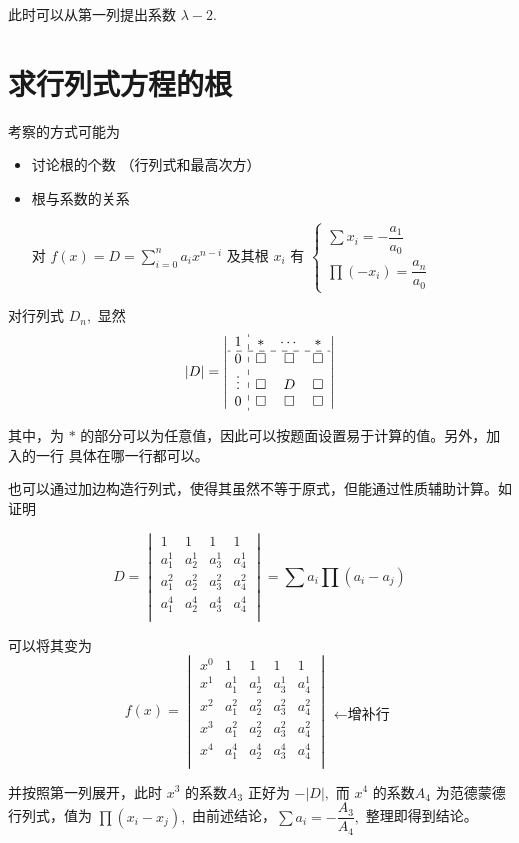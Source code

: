 此时可以从第一列提出系数 $ \lambda - 2. $ 

\section{求行列式方程的根}

考察的方式可能为
\begin{itemize}
    \item 讨论根的个数 （行列式和最高次方）
    \item 根与系数的关系
    
    对 $ f(x) = D = \sum_{i = 0}^n a_i x^{n-i} $ 及其根 $ x_i $ 
    有 $ \begin{cases}
        \sum x_i = -\dfrac{a_1}{a_0} \\ 
        \prod (-x_i) = \dfrac{a_n}{a_0}
    \end{cases} $ 
\end{itemize}


对行列式 $ D_n, $ 显然$$
    |D| = \left|
    \begin{array}{c:ccc}
        1&*&\cdots&*\\ \hdashline
        0&\square&\square&\square\\
        \vdots&\square&D&\square\\
        0&\square&\square&\square\\
    \end{array}
    \right|
$$ 

其中，为 $ * $ 的部分可以为任意值，因此可以按题面设置易于计算的值。另外，加入的一行
具体在哪一行都可以。

也可以通过加边构造行列式，使得其虽然不等于原式，但能通过性质辅助计算。如证明

$$
    D = \begin{vmatrix}
        1&1&1 &1 \\
        a_1^1&a_2^1 &a_3^1 &a_4^1 \\
        a_1^2&a_2^2 &a_3^2 &a_4^2 \\
        a_1^4&a_2^4 &a_3^4 &a_4^4 \\
    \end{vmatrix} = \sum a_i \prod (a_i - a_j)
$$ 

可以将其变为$$
    f(x) = \begin{vmatrix}
        x^0&1&1&1 &1 \\
        x^1&a_1^1&a_2^1 &a_3^1 &a_4^1 \\
        x^2&a_1^2&a_2^2 &a_3^2 &a_4^2 \\
        x^3&a_1^2&a_2^2 &a_3^2 &a_4^2 \\
        x^4&a_1^4&a_2^4 &a_3^4 &a_4^4 \\
    \end{vmatrix} \begin{matrix}
        \\ \\ \\ \leftarrow \textrm{增补行} \\ \\
    \end{matrix}
$$ 

并按照第一列展开，此时 $ x^3 $ 的系数$ A_3 $ 正好为 $ -|D|, $ 而
$ x^4 $ 的系数$ A_4 $ 为范德蒙德行列式，值为 $ \prod (x_i-x_j), $ 
由前述结论，$ \sum a_i = -\dfrac{A_3}{A_4}, $ 整理即得到结论。
